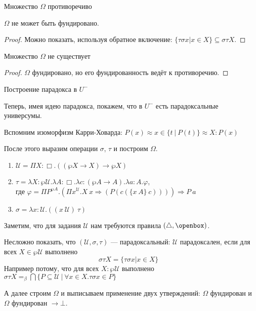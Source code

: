 \documentclass[aspectratio=169,dvipsnames,usenames]{beamer}
\begin{document}
\begin{frame}{Множество $\Omega$ противоречиво}
\begin{lmm} $\Omega$ не может быть фундировано. \end{lmm}
\begin{proof} Можно показать, используя обратное включение: $\{\tau\sigma x| x \in X\} \subseteq \sigma\tau X$.\end{proof}

\begin{thm}Множество $\Omega$ не существует\end{thm}
\begin{proof}$\Omega$ фундировано, но его фундированность ведёт к противоречию.\end{proof}
\end{frame}

\begin{frame}{Построение парадокса в $U^-$}

Теперь, имея идею парадокса, покажем, что в $U^-$ есть парадоксальные универсумы.

Вспомним изоморфизм Карри-Ховарда: $P(x) \approx x \in \{ t\ |\ P(t)\} \approx X : P(x)$

После этого выразим операции $\sigma$, $\tau$ и построим $\Omega$.

\begin{enumerate}
\item $\mathcal{U} = \Pi X : \Box . ((\wp X \rightarrow X) \rightarrow \wp X)$
\item $\tau = \lambda X : \wp\mathcal{U}. \lambda A : \Box.\lambda c : (\wp A \rightarrow A).\lambda a : A.\varphi$,\\
где
 $\varphi = \Pi P^{\wp A}.(\Pi x^\mathcal{U}.X\ x\Rightarrow (P (c (\{x\ A\}\ c)))) \Rightarrow P\ a$

\item $\sigma = \lambda x : \mathcal{U} . ((x\ \mathcal{U})\ \tau)$
\end{enumerate}

Заметим, что для задания $\mathcal{U}$ нам требуются правила $(\triangle,\openbox)$.

Несложно показать, что $(\mathcal{U},\sigma,\tau)$ --- парадоксальный:
$\mathcal{U}$ парадоксален, если для всех $X \in \wp\mathcal{U}$ выполнено $$\sigma\tau X = \{\tau\sigma x | x \in X \}$$
Например потому, что для всех $X: \wp \mathcal{U}$ выполнено $\sigma\tau X =_\beta \bigcap \{ P \subseteq \mathcal{U}\ |\ \forall x \in X.\tau\sigma x \in P \}$

А далее строим $\Omega$ и выписываем применение двух утверждений:
$\Omega$ фундирован и $\Omega$ фундирован $\rightarrow \bot$.
\end{frame}
\end{document}
